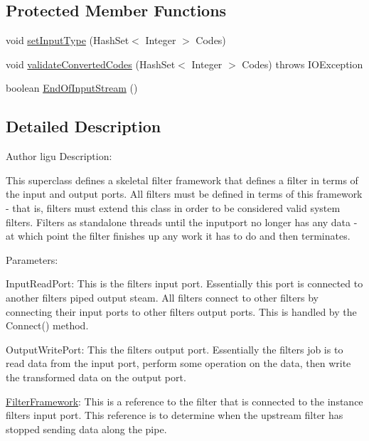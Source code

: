 \subsection*{Protected Member Functions}
\begin{DoxyCompactItemize}
\item 
void \hyperlink{class_system_a_1_1_filter_framework_a856b3a8b6b49ad1124de579485e86122}{set\+Input\+Type} (Hash\+Set$<$ Integer $>$ Codes)
\item 
void \hyperlink{class_system_a_1_1_filter_framework_a20e7a6999d87d75474742dafd6edb482}{validate\+Converted\+Codes} (Hash\+Set$<$ Integer $>$ Codes)  throws I\+O\+Exception
\item 
boolean \hyperlink{class_system_a_1_1_filter_framework_ac54511ad34d190b58ea3baecd6a70692}{End\+Of\+Input\+Stream} ()
\end{DoxyCompactItemize}


\subsection{Detailed Description}
\begin{DoxyAuthor}{Author}
ligu Description\+:
\end{DoxyAuthor}
This superclass defines a skeletal filter framework that defines a filter in terms of the input and output ports. All filters must be defined in terms of this framework -\/ that is, filters must extend this class in order to be considered valid system filters. Filters as standalone threads until the inputport no longer has any data -\/ at which point the filter finishes up any work it has to do and then terminates.

Parameters\+:

Input\+Read\+Port\+: This is the filter\textquotesingle{}s input port. Essentially this port is connected to another filter\textquotesingle{}s piped output steam. All filters connect to other filters by connecting their input ports to other filter\textquotesingle{}s output ports. This is handled by the Connect() method.

Output\+Write\+Port\+: This the filter\textquotesingle{}s output port. Essentially the filter\textquotesingle{}s job is to read data from the input port, perform some operation on the data, then write the transformed data on the output port.

\hyperlink{class_system_a_1_1_filter_framework}{Filter\+Framework}\+: This is a reference to the filter that is connected to the instance filter\textquotesingle{}s input port. This reference is to determine when the upstream filter has stopped sending data along the pipe.

